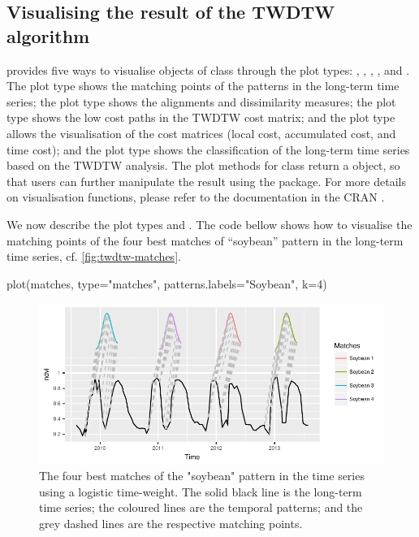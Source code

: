 \documentclass[article,shortnames]{jss}
\begin{document}
\subsection{Visualising the result of the TWDTW
algorithm}\label{visualising-the-result-of-the-twdtw-algorithm}

 provides five ways to visualise objects of class
 through the plot types: ,
, , , and .
The plot type  shows the matching points of the patterns
in the long-term time series; the plot type  shows the
alignments and dissimilarity measures; the plot type  shows
the low cost paths in the TWDTW cost matrix; and the plot type
 allows the visualisation of the cost matrices (local cost,
accumulated cost, and time cost); and the plot type
 shows the classification of the long-term time
series based on the TWDTW analysis. The plot methods for class
 return a  object, so that users can
further manipulate the result using the  package. For more
details on visualisation functions, please refer to the 
documentation in the CRAN \citep{Maus:2015a}.

We now describe the plot types  and . The
code bellow shows how to visualise the matching points of the four best
matches of ``soybean'' pattern in the long-term time series, cf.
\autoref{fig:twdtw-matches}.

\begin{CodeChunk}
\begin{CodeInput}
plot(matches, type="matches", patterns.labels="Soybean", k=4)
\end{CodeInput}
\begin{figure}[!h]

{\centering \includegraphics{applying_twdtw_files/figure-latex/twdtw-matches-1} 

}

\caption[The four best matches of the "soybean" pattern in the time series using a logistic time-weight]{The four best matches of the "soybean" pattern in the time series using a logistic time-weight. The solid black line is the long-term time series; the coloured lines are the temporal patterns; and the grey dashed lines are the respective matching points.}\label{fig:twdtw-matches}
\end{figure}
\end{CodeChunk}
\end{document}
